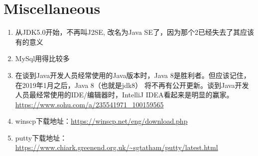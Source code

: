 \documentclass[a4paper, 12pt]{article}
\begin{document}
\section{Miscellaneous}

\begin{enumerate}
\item 从JDK5.0开始，不再叫J2SE, 改名为Java SE了，因为那个2已经失去了其应该有的意义

\item MySql用得比较多

\item 在谈到Java开发人员经常使用的Java版本时，Java 8是胜利者。但应该记住，在2019年1月之后，Java 8（也就是jdk8） 将不再有公开更新。谈到Java开发人员最经常使用的IDE/编辑器时，IntelliJ IDEA看起来是明显的赢家。 \url{https://www.sohu.com/a/235541971_100159565}

\item winscp下载地址：\url{https://winscp.net/eng/download.php}

\item putty下载地址：\url{https://www.chiark.greenend.org.uk/~sgtatham/putty/latest.html}

\end{enumerate}
\end{document}
